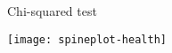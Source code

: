 \documentclass[t]{beamer}
\begin{document}
	
	\begin{frame}[c]{Chi-squared test}

		\texttt{[image: spineplot-health]}
		
	\end{frame}

	
\end{document}

